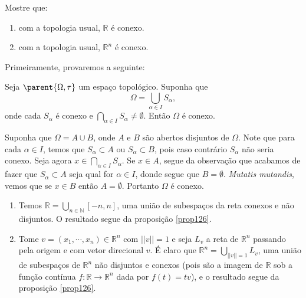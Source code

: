 \begin{Mybox}
Mostre que:
\begin{enumerate}[label=\color{blue}\normalfont\textbf{(\alph*)}]
\item com a topologia usual, $\mathbb{R}$ é conexo.
\item com a topologia usual, $\mathbb{R}^n$ é conexo.
\end{enumerate}
\vspace{-.4cm}
\end{Mybox}
\vspace{-.5cm}
\begin{dem}
Primeiramente, provaremos a seguinte:
\begin{proposicao}\label{prop126}
Seja $\parent{\Omega, \tau}$ um espaço topológico. Suponha que 
\[
\Omega = \bigcup_{\alpha \in I} S_{\alpha},
\]
onde cada $S_{\alpha}$ é conexo e $\bigcap_{\alpha \in I} S_{\alpha} \neq \emptyset$. Então $\Omega$ é conexo.
\end{proposicao}
\begin{demm}
Suponha que $\Omega = A \cup B$, onde $A$ e $B$ são abertos disjuntos de $\Omega$. Note que para cada $\alpha \in I$, temos que $S_{\alpha} \subset A$ ou $S_{\alpha} \subset B$, pois caso contrário $S_{\alpha}$ não seria conexo. Seja agora $x \in \bigcap_{\alpha \in I} S_{\alpha}$. Se $x \in A$, segue da observação que acabamos de fazer que $S_{\alpha} \subset A$ seja qual for $\alpha \in I$, donde segue que $B = \emptyset$. \emph{Mutatis mutandis}, vemos que se $x \in B$ então $A = \emptyset$. Portanto $\Omega$ é conexo.
\end{demm}
\begin{enumerate}[label=\color{blue}\normalfont\textbf{(\alph*)}]
        \item Temos $\mathbb{R} = \displaystyle{ \bigcup_{n \in \mathbb{N}} [-n, n]}$, uma união de subespaços da reta conexos e não disjuntos. O resultado segue da proposição \cref{prop126}.
        \item Tome $v = (x_1, \cdots, x_n) \in \mathbb{R}^n$ com $||v|| = 1$ e seja $L_v$ a reta de $\mathbb{R}^n$ passando pela origem e com vetor direcional $v$. É claro que $\mathbb{R}^n = \displaystyle{\bigcup_{||v|| = 1} L_v}$, uma união de subespaços de $\mathbb{R}^n$ não disjuntos e conexos (pois são a imagem de $\mathbb{R}$ sob a função contínua $f: \mathbb{R} \to \mathbb{R}^n$ dada por $f(t) = tv$), e o resultado segue da proposição \cref{prop126}.
\end{enumerate}
\end{dem}


